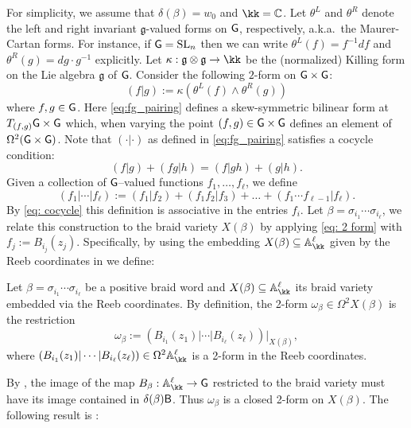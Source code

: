 For simplicity, we assume that $\delta(\beta) = w_0$ and $\kk=\C$. Let $\theta^L$ and $\theta^{R}$ denote the left and right invariant $\mathfrak{g}$-valued forms on $\mathsf{G}$, respectively, a.k.a.~the Maurer-Cartan forms. For instance, if $\mathsf{G} = \operatorname{SL}_n$ then we can write $\theta^L(f) = f^{-1}df$ and $\theta^{R}(g) = dg\cdot g^{-1}$ explicitly. Let $\kappa: \mathfrak{g} \otimes \mathfrak{g} \to \kk$ be the (normalized) Killing form on the Lie algebra $\mathfrak{g}$ of $\mathsf{G}$. Consider the following $2$-form on $\mathsf{G} \times \mathsf{G}$:
\begin{equation}\label{eq:fg_pairing}
(f|g) := \kappa(\theta^L(f)\wedge\theta^{R}(g))
\end{equation}
\noindent where $f,g\in\mathsf{G}$. Here \eqref{eq:fg_pairing} defines a skew-symmetric bilinear form at $T_{(f,g)}\mathsf{G}\times\mathsf{G}$ which, when varying the point $(f,g)\in\mathsf{G}\times\mathsf{G}$ defines an element of $\Omega^2(\mathsf{G}\times\mathsf{G})$. Note that $(\cdot|\cdot)$ as defined in \eqref{eq:fg_pairing} satisfies a cocycle condition:
\begin{equation}
\label{eq: cocycle}
(f|g)+(fg|h)=(f|gh)+(g|h).
\end{equation}
Given a collection of $\mathsf{G}$--valued functions $f_1,\ldots,f_{\ell}$, we define
\begin{equation}
    \label{eq: 2 form}
(f_1|\cdots |f_{\ell}):=(f_1|f_2)+(f_1f_2|f_3)+\ldots+(f_1\cdots f_{\ell-1}|f_{\ell}).
\end{equation}
\noindent By \eqref{eq: cocycle} this definition is associative in the entries $f_i$. Let $\beta=\sigma_{i_1}\cdots\sigma_{i_\ell}$, we relate this construction to the braid variety $X(\beta)$ by applying \eqref{eq: 2 form} with $f_j:=B_{i_j}(z_j)$. Specifically, by using the embedding $X(\beta)\sse\mathbb{A}_\kk^\ell$ given by the Reeb coordinates in  we define:
\begin{definition}\label{def:braid_variety_2_form} Let $\beta=\sigma_{i_1}\cdots\sigma_{i_\ell}$ be a positive braid word and $X(\beta)\sse\mathbb{A}_\kk^\ell$ its braid variety embedded via the Reeb coordinates. By definition, the 2-form $\omega_\beta\in\Omega^2X(\beta)$ is the restriction
\begin{equation}\label{eq:braid2form}
\omega_\beta:=(B_{i_1}(z_1)|\cdots |B_{i_{\ell}}(z_{\ell}))|_{X(\beta)},
\end{equation}
where $(B_{i_1}(z_1)|\cdots |B_{i_{\ell}}(z_{\ell}))\in\Omega^2\mathbb{A}_\kk^\ell$ is a 2-form in the Reeb coordinates.\sbs
\end{definition}
By , the image of the map $B_{\beta}: \mathbb{A}_\kk^\ell \to \G$ restricted to the braid variety must have its image contained in $\delta(\beta)\mathsf{B}$. Thus $\omega_\beta$ is a closed 2-form on $X(\beta)$. The following result is \cite[Theorem 9.5]{CGGLSS25}:

